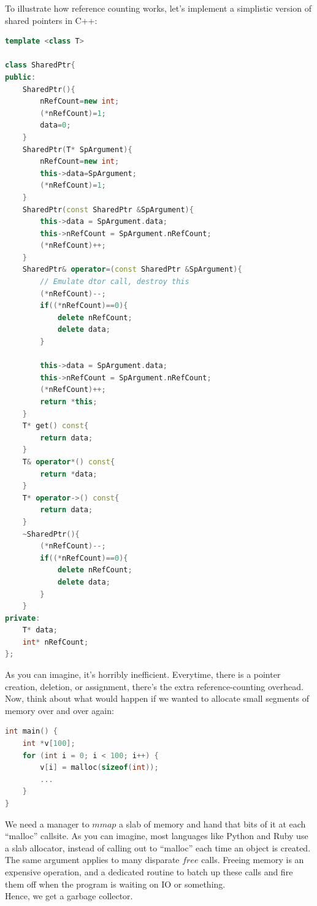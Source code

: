 \documentclass{article}
\begin{document}
To illustrate how reference counting works, let's implement a
simplistic version of shared pointers in C++:
\begin{lstlisting}[language=c++]
template <class T>

class SharedPtr{
public:
	SharedPtr(){
		nRefCount=new int;
		(*nRefCount)=1;
		data=0;
	}
	SharedPtr(T* SpArgument){
		nRefCount=new int;
		this->data=SpArgument;
		(*nRefCount)=1;
	}
	SharedPtr(const SharedPtr &SpArgument){
		this->data = SpArgument.data;
		this->nRefCount = SpArgument.nRefCount;
		(*nRefCount)++;
	}
	SharedPtr& operator=(const SharedPtr &SpArgument){
		// Emulate dtor call, destroy this
		(*nRefCount)--;
		if((*nRefCount)==0){
			delete nRefCount;
			delete data;
		}

		this->data = SpArgument.data;
		this->nRefCount = SpArgument.nRefCount;
		(*nRefCount)++;
		return *this;
	}
	T* get() const{
		return data;
	}
	T& operator*() const{
		return *data;
	}
	T* operator->() const{
		return data;
	}
	~SharedPtr(){
		(*nRefCount)--;
		if((*nRefCount)==0){
			delete nRefCount;
			delete data;
		}
	}
private:
	T* data;
	int* nRefCount;
};
\end{lstlisting}
As you can imagine, it's horribly inefficient. Everytime, there is a
pointer creation, deletion, or assignment, there's the extra
reference-counting overhead.\\

Now, think about what would happen if we wanted to allocate small
segments of memory over and over again:
\begin{lstlisting}[language=c]
int main() {
	int *v[100];
	for (int i = 0; i < 100; i++) {
		v[i] = malloc(sizeof(int));
		...
	}
}
\end{lstlisting}
We need a manager to $mmap$ a slab of memory and hand that bits of it
at each ``malloc'' callsite. As you can imagine, most languages like
Python and Ruby use a slab allocator, instead of calling out to
``malloc'' each time an object is created.\\

The same argument applies to many disparate $free$ calls. Freeing
memory is an expensive operation, and a dedicated routine to batch up
these calls and fire them off when the program is waiting on IO or
something.\\

Hence, we get a garbage collector.
\end{document}
